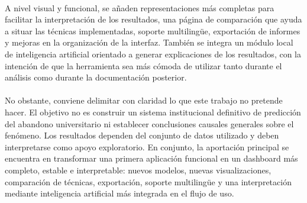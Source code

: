 \paragraph*{}A nivel visual y funcional, se añaden representaciones más completas para facilitar la interpretación de los resultados, una página de comparación que ayuda a situar las técnicas implementadas, soporte multilingüe, exportación de informes y mejoras en la organización de la interfaz. También se integra un módulo local de inteligencia artificial orientado a generar explicaciones de los resultados, con la intención de que la herramienta sea más cómoda de utilizar tanto durante el análisis como durante la documentación posterior.

\paragraph*{}No obstante, conviene delimitar con claridad lo que este trabajo no pretende hacer. El objetivo no es construir un sistema institucional definitivo de predicción del abandono universitario ni establecer conclusiones causales generales sobre el fenómeno. Los resultados dependen del conjunto de datos utilizado y deben interpretarse como apoyo exploratorio. En conjunto, la aportación principal se encuentra en transformar una primera aplicación funcional en un dashboard más completo, estable e interpretable: nuevos modelos, nuevas visualizaciones, comparación de técnicas, exportación, soporte multilingüe y una interpretación mediante inteligencia artificial más integrada en el flujo de uso.
